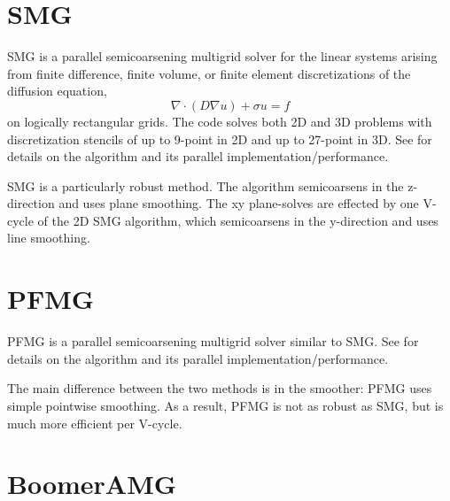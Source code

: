 
\section{SMG}

SMG is a parallel semicoarsening multigrid solver for the linear
systems arising from finite difference, finite volume, or finite
element discretizations of the diffusion equation,
\begin{equation}
\nabla \cdot ( D \nabla u ) + \sigma u = f
\end{equation}
on logically rectangular grids.  The code solves both 2D and 3D
problems with discretization stencils of up to 9-point in 2D and up to
27-point in 3D.  See
\cite{SSchaffer_1998a,PNBrown_RDFalgout_JEJones_2000,RDFalgout_JEJones_2000}
for details on the algorithm and its parallel implementation/performance.

SMG is a particularly robust method.  The algorithm semicoarsens in
the z-direction and uses plane smoothing.  The xy plane-solves are
effected by one V-cycle of the 2D SMG algorithm, which semicoarsens in
the y-direction and uses line smoothing.


\section{PFMG}

PFMG is a parallel semicoarsening multigrid solver similar to SMG.
See \cite{SFAshby_RDFalgout_1996,RDFalgout_JEJones_2000} for details
on the algorithm and its parallel implementation/performance.

The main difference between the two methods is in the smoother: PFMG
uses simple pointwise smoothing.  As a result, PFMG is not as robust
as SMG, but is much more efficient per V-cycle.


\section{BoomerAMG}

